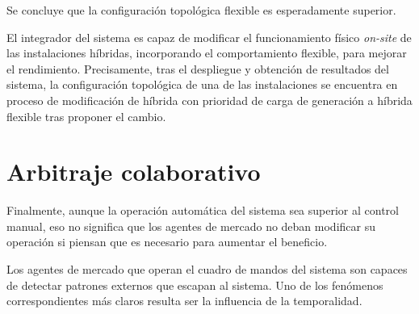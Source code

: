 \begin{table}[ht]
  \centering
  \caption[Comparación de configuraciones topológicas híbridas.]{Comparación de las métricas de las configuraciones topológicas híbridas.}%
  \label{tab:comparacion-hibridacion}
\end{table}

Se concluye que la configuración topológica flexible es esperadamente superior.

El integrador del sistema es capaz de modificar el funcionamiento físico \textit{on-site} de las instalaciones híbridas, incorporando el comportamiento flexible, para mejorar el rendimiento. Precisamente, tras el despliegue y obtención de resultados del sistema, la configuración topológica de una de las instalaciones se encuentra en proceso de modificación de híbrida con prioridad de carga de generación a híbrida flexible tras proponer el cambio.

\section{Arbitraje colaborativo}%
\label{makereference7.5}

Finalmente, aunque la operación automática del sistema sea superior al control manual, eso no significa que los agentes de mercado no deban modificar su operación si piensan que es necesario para aumentar el beneficio.

Los agentes de mercado que operan el cuadro de mandos del sistema son capaces de detectar patrones externos que escapan al sistema. Uno de los fenómenos correspondientes más claros resulta ser la influencia de la temporalidad.

